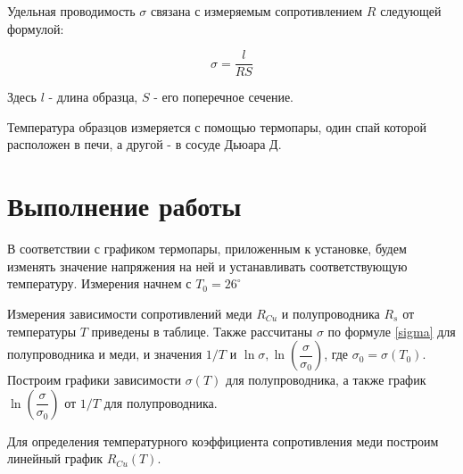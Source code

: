 \documentclass[12pt]{kiarticle}
\begin{document}
	Удельная проводимость $\sigma$ связана с измеряемым сопротивлением $R$ следующей формулой: 
	
\begin{equation}\label{sigma}
	 \sigma = \frac{l}{RS} 
\end{equation}
	
	Здесь $l$ - длина образца, $S$ - его поперечное сечение.
	
	Температура образцов измеряется с помощью термопары, один спай которой расположен в печи, а другой - в сосуде Дьюара Д. 
	
	\section{Выполнение работы}
	
	В соответствии с графиком термопары, приложенным к установке, будем изменять значение напряжения на ней и устанавливать соответствующую температуру. Измерения начнем с $ T_0 = 26^\circ $
	
	Измерения зависимости сопротивлений меди $R_{Cu}$ и полупроводника $R_s$ от температуры $T$ приведены в таблице. Также рассчитаны $ \sigma $ по формуле \eqref{sigma} для полупроводника и меди, и значения $ 1/T$ и $ \ln \sigma, \ln \left( \dfrac{\sigma}{\sigma_0} \right) $, где $ \sigma_0 = \sigma (T_0) $. Построим графики зависимости $ \sigma (T) $ для полупроводника, а также график $ \ln \left( \dfrac{\sigma}{\sigma_0} \right) $ от $ 1/T $ для полупроводника. 
	
	Для определения температурного коэффициента сопротивления меди построим линейный график $ R_{Cu}(T) $.
	
\end{document}
